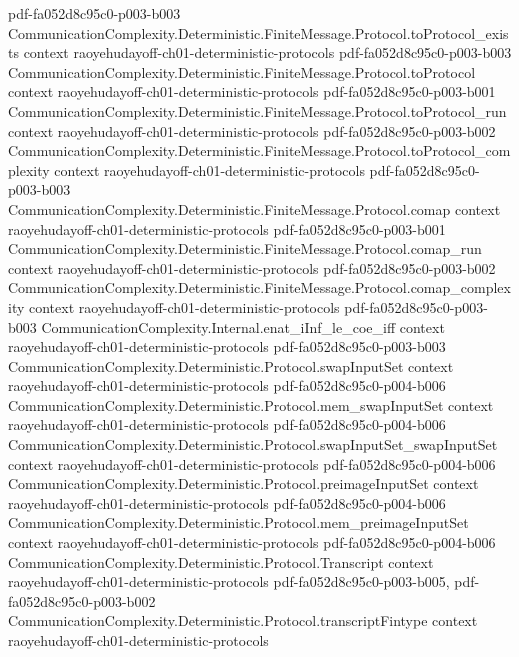 \begin{theorem}
  {pdf-fa052d8c95c0-p003-b003}
\proofstep
  {CommunicationComplexity.Deterministic.FiniteMessage.Protocol.toProtocol_exists}
  {context}
  {raoyehudayoff-ch01-deterministic-protocols}
  {pdf-fa052d8c95c0-p003-b003}
\proofstep
  {CommunicationComplexity.Deterministic.FiniteMessage.Protocol.toProtocol}
  {context}
  {raoyehudayoff-ch01-deterministic-protocols}
  {pdf-fa052d8c95c0-p003-b001}
\proofstep
  {CommunicationComplexity.Deterministic.FiniteMessage.Protocol.toProtocol_run}
  {context}
  {raoyehudayoff-ch01-deterministic-protocols}
  {pdf-fa052d8c95c0-p003-b002}
\proofstep
  {CommunicationComplexity.Deterministic.FiniteMessage.Protocol.toProtocol_complexity}
  {context}
  {raoyehudayoff-ch01-deterministic-protocols}
  {pdf-fa052d8c95c0-p003-b003}
\proofstep
  {CommunicationComplexity.Deterministic.FiniteMessage.Protocol.comap}
  {context}
  {raoyehudayoff-ch01-deterministic-protocols}
  {pdf-fa052d8c95c0-p003-b001}
\proofstep
  {CommunicationComplexity.Deterministic.FiniteMessage.Protocol.comap_run}
  {context}
  {raoyehudayoff-ch01-deterministic-protocols}
  {pdf-fa052d8c95c0-p003-b002}
\proofstep
  {CommunicationComplexity.Deterministic.FiniteMessage.Protocol.comap_complexity}
  {context}
  {raoyehudayoff-ch01-deterministic-protocols}
  {pdf-fa052d8c95c0-p003-b003}
\proofstep
  {CommunicationComplexity.Internal.enat_iInf_le_coe_iff}
  {context}
  {raoyehudayoff-ch01-deterministic-protocols}
  {pdf-fa052d8c95c0-p003-b003}
\proofstep
  {CommunicationComplexity.Deterministic.Protocol.swapInputSet}
  {context}
  {raoyehudayoff-ch01-deterministic-protocols}
  {pdf-fa052d8c95c0-p004-b006}
\proofstep
  {CommunicationComplexity.Deterministic.Protocol.mem_swapInputSet}
  {context}
  {raoyehudayoff-ch01-deterministic-protocols}
  {pdf-fa052d8c95c0-p004-b006}
\proofstep
  {CommunicationComplexity.Deterministic.Protocol.swapInputSet_swapInputSet}
  {context}
  {raoyehudayoff-ch01-deterministic-protocols}
  {pdf-fa052d8c95c0-p004-b006}
\proofstep
  {CommunicationComplexity.Deterministic.Protocol.preimageInputSet}
  {context}
  {raoyehudayoff-ch01-deterministic-protocols}
  {pdf-fa052d8c95c0-p004-b006}
\proofstep
  {CommunicationComplexity.Deterministic.Protocol.mem_preimageInputSet}
  {context}
  {raoyehudayoff-ch01-deterministic-protocols}
  {pdf-fa052d8c95c0-p004-b006}
\proofstep
  {CommunicationComplexity.Deterministic.Protocol.Transcript}
  {context}
  {raoyehudayoff-ch01-deterministic-protocols}
  {pdf-fa052d8c95c0-p003-b005,
    pdf-fa052d8c95c0-p003-b002}
\proofstep
  {CommunicationComplexity.Deterministic.Protocol.transcriptFintype}
  {context}
  {raoyehudayoff-ch01-deterministic-protocols}

\end{theorem}
